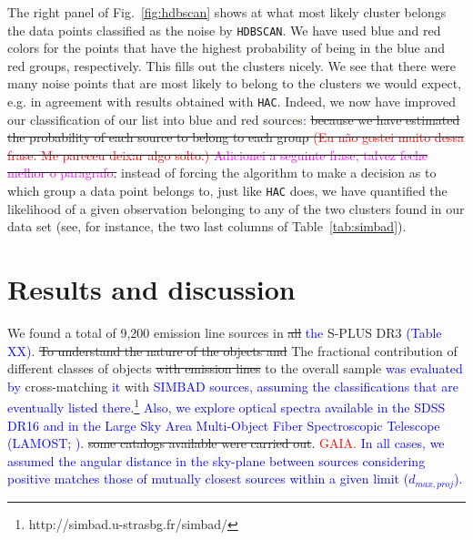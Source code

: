 \documentclass[fleqn,usenatbib]{mnras}
\newcommand{\rlopes}[1]{\textcolor{blue}{#1}}
\newcommand{\comment}[1]{\textcolor{red}{#1}}
\newcommand{\luis}[1]{\textcolor{magenta}{#1}}
\begin{document}
The right panel of Fig.~\ref{fig:hdbscan} shows at what most likely cluster belongs the data
points classified as the noise by \texttt{HDBSCAN}. We have used blue and red colors for the
points that have the highest probability of being in the blue and red groups, respectively.
This fills out the clusters nicely. We see that there were many noise points that are most
likely to belong to the clusters we would expect, e.g. in agreement 
with 
results obtained
with \texttt{HAC}. Indeed, we now have improved our classification of our list into blue and 
red sources\rlopes{:} 
\sout{because we have estimated the probability of each source to belong
to each group \comment{(Eu não gostei muito dessa frase. Me pareceu deixar algo solto.)} \luis{Adicionei a seguinte frase, talvez feche melhor o paragrafo}.} instead of forcing the algorithm to make a decision as to which group a data point belongs to, just like \texttt{HAC} does, we have quantified the likelihood of a given observation belonging to any of the two clusters found in our data set (see, for instance, the two last columns of Table~\ref{tab:simbad}).  

\section{Results and discussion}
\label{sec:results}


We found a total of 9,200 emission line sources in \sout{all} \rlopes{the} S-PLUS DR3 \rlopes{(Table XX)}.
\sout{To understand the nature of the objects and} The fractional contribution of different classes of objects 
\sout{with emission lines}
to the overall sample 
\rlopes{was evaluated by} 
cross-matching 
\rlopes{it} with \rlopes{SIMBAD sources, assuming the classifications that are eventually listed there}.\footnote{http://simbad.u-strasbg.fr/simbad/} 
\rlopes{Also, we explore optical spectra available in the SDSS DR16 \citep{Ahumada:2020} and in the Large Sky Area Multi-Object Fiber Spectroscopic Telescope
(LAMOST; \citealp{Wu:2011}).}
\sout{some catalogs available were carried out}.
\comment{GAIA.} 
\rlopes{In all cases, we assumed the angular distance in the sky-plane between sources considering positive matches those of mutually closest sources within a given limit ($d_{max,proj}$).
}
\end{document}
